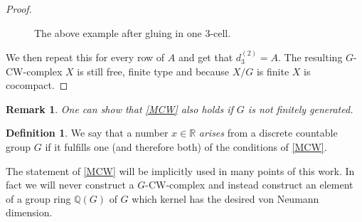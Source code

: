\documentclass[12pt,a4paper]{scrartcl}
\theoremstyle{plain}
\newtheorem{Remark}[Theorem]{Remark}
\theoremstyle{definition}
\newtheorem{Definition}[Theorem]{Definition}
\newcommand{\R}{\mathbb{R}} %
\newcommand{\Q}{\mathbb{Q}} %
\newcommand{\2}{\mathbb{Z} / 2 \mathbb{Z}}
\newcommand{\1}{\bar{1}}
\newcommand{\0}{\bar{0}}
\begin{document}
\begin{proof}
\begin{figure}[H]
			\caption{The above example after gluing in one $3$-cell.}
			\label{GCW_Grafik2}
		\end{figure}
		
		
	We then repeat this for every row of $A$ and get that $d_3^{(2)} = A$. The resulting $G$-CW-complex $X$ is still free, finite type and because $X/G$ is finite $X$ is cocompact.
\end{proof}




\begin{Remark}
	One can show that \ref{MCW} also holds if $G$ is not finitely generated.
\end{Remark}
\begin{Definition}\label{def_arising}
	We say that a number $x \in \R$ \emph{arises} from a discrete countable group $G$ if it fulfills one (and therefore both) of the conditions of \ref{MCW}.
\end{Definition}
The statement of \ref{MCW} will be implicitly used in many points of this work. In fact we will never construct a $G$-CW-complex and instead construct an element of a group ring $\Q (G)$ of $G$ which kernel has the desired von Neumann dimension.
\end{document}
